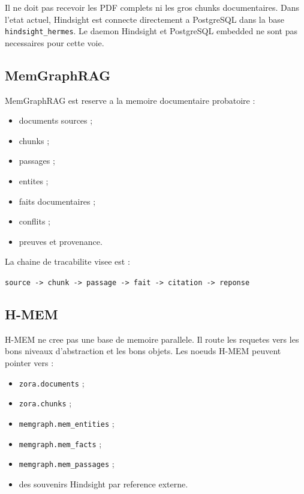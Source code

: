 \documentclass[11pt,a4paper]{article}
\begin{document}
Il ne doit pas recevoir les PDF complets ni les gros chunks documentaires. Dans
l'etat actuel, Hindsight est connecte directement a PostgreSQL dans la base
\texttt{hindsight\_hermes}. Le daemon Hindsight et PostgreSQL embedded ne sont
pas necessaires pour cette voie.

\subsection{MemGraphRAG}

MemGraphRAG est reserve a la memoire documentaire probatoire :

\begin{itemize}[leftmargin=*]
  \item documents sources ;
  \item chunks ;
  \item passages ;
  \item entites ;
  \item faits documentaires ;
  \item conflits ;
  \item preuves et provenance.
\end{itemize}

La chaine de tracabilite visee est :

\begin{center}
\texttt{source -> chunk -> passage -> fait -> citation -> reponse}
\end{center}

\subsection{H-MEM}

H-MEM ne cree pas une base de memoire parallele. Il route les requetes vers les
bons niveaux d'abstraction et les bons objets. Les noeuds H-MEM peuvent pointer
vers :

\begin{itemize}[leftmargin=*]
  \item \texttt{zora.documents} ;
  \item \texttt{zora.chunks} ;
  \item \texttt{memgraph.mem\_entities} ;
  \item \texttt{memgraph.mem\_facts} ;
  \item \texttt{memgraph.mem\_passages} ;
  \item des souvenirs Hindsight par reference externe.
\end{itemize}
\end{document}
